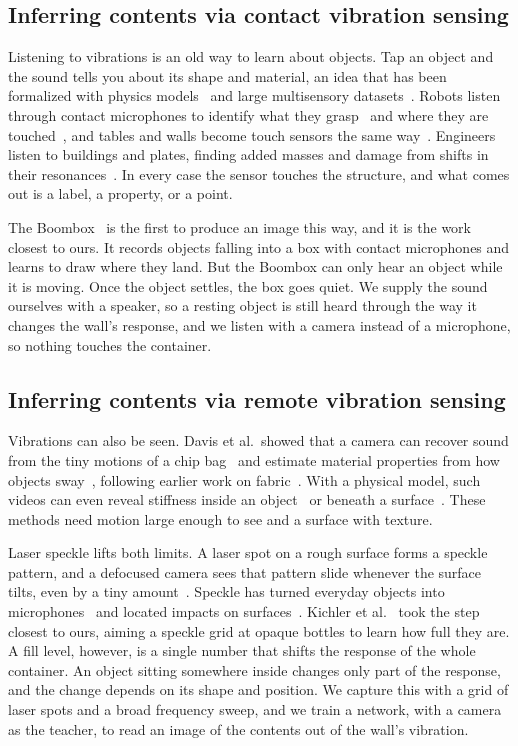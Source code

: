 \subsection{Inferring contents via contact vibration sensing}
Listening to vibrations is an old way to learn about objects.
Tap an object and the sound tells you about its shape and material, an idea that has been formalized with physics models~\cite{zhang2017shape} and large multisensory datasets~\cite{gao2023objectfolder,clarke2023realimpact}.
Robots listen through contact microphones to identify what they grasp~\cite{liu2024sonicsense} and where they are touched~\cite{zaielamri2026vibrosense}, and tables and walls become touch sensors the same way~\cite{liu2017vibsense,iravantchi2023sawsense}.
Engineers listen to buildings and plates, finding added masses and damage from shifts in their resonances~\cite{dackermann2013identification,ostachowicz2002location,azuara2021damage}.
In every case the sensor touches the structure, and what comes out is a label, a property, or a point.

The Boombox~\cite{chen2021boombox} is the first to produce an image this way, and it is the work closest to ours.
It records objects falling into a box with contact microphones and learns to draw where they land.
But the Boombox can only hear an object while it is moving.
Once the object settles, the box goes quiet.
We supply the sound ourselves with a speaker, so a resting object is still heard through the way it changes the wall's response, and we listen with a camera instead of a microphone, so nothing touches the container.

\subsection{Inferring contents via remote vibration sensing}
Vibrations can also be seen.
Davis et al.\ showed that a camera can recover sound from the tiny motions of a chip bag~\cite{davis2014visual} and estimate material properties from how objects sway~\cite{davis2015visual}, following earlier work on fabric~\cite{bouman2013estimating}.
With a physical model, such videos can even reveal stiffness inside an object~\cite{feng2022visual} or beneath a surface~\cite{ogren2025visual}.
These methods need motion large enough to see and a surface with texture.

Laser speckle lifts both limits.
A laser spot on a rough surface forms a speckle pattern, and a defocused camera sees that pattern slide whenever the surface tilts, even by a tiny amount~\cite{zalevsky2009simultaneous}.
Speckle has turned everyday objects into microphones~\cite{sheinin2022dual,cai2025event2audio,bagon2026drum} and located impacts on surfaces~\cite{zhang2023analyzing}.
Kichler et al.~\cite{kichler2025learning} took the step closest to ours, aiming a speckle grid at opaque bottles to learn how full they are.
A fill level, however, is a single number that shifts the response of the whole container.
An object sitting somewhere inside changes only part of the response, and the change depends on its shape and position.
We capture this with a grid of laser spots and a broad frequency sweep, and we train a network, with a camera as the teacher, to read an image of the contents out of the wall's vibration.


